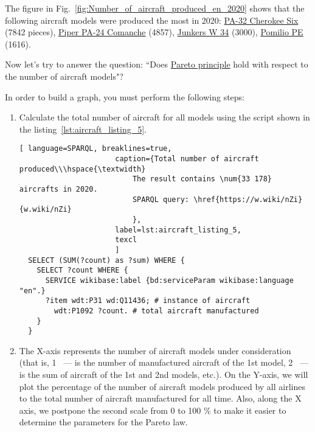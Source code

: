 The figure in Fig.~\ref{fig:Number_of_aircraft_produced_en_2020} shows that the following aircraft models were produced the most in 
2020: \href{https://www.wikidata.org/wiki/Q2096452}{PA-32 Cherokee Six} (\num{7842} pieces), \href{https://www.wikidata.org/wiki/Q1860367}{Piper PA-24 Comanche} 
(\num{4857}), \href{https://www.wikidata.org/wiki/Q694521}{Junkers W 34} (\num{3000}), \href{https://www.wikidata.org/wiki/Q941011}{Pomilio PE} 
(\num{1616}).

\begin{figure*}[h]

    \setlength{\fboxsep}{0pt}%
    \setlength{\fboxrule}{1pt}%

	\caption{Number of aircraft produced by model, 2020.}%
    \label{fig:Number_of_aircraft_produced_en_2020}%
\end{figure*}

Now let's try to answer the question: ``Does \href{https://en.wikipedia.org/wiki/Pareto_principle}{Pareto principle} hold with respect to the 
number of aircraft models"?

In order to build a graph, you must perform the following steps:

\begin{enumerate} 
  \item Calculate the total number of aircraft for all models using the script shown in the listing~\ref{lst:aircraft_listing_5}.

  \begin{lstlisting}[ language=SPARQL, breaklines=true,  
                      caption={Total number of aircraft produced\\\hspace{\textwidth}
                          The result contains \num{33 178} aircrafts in 2020.
                          SPARQL query: \href{https://w.wiki/nZi}{w.wiki/nZi}
                          },
                      label=lst:aircraft_listing_5,
                      texcl 
                      ]
  SELECT (SUM(?count) as ?sum) WHERE {
    SELECT ?count WHERE {
      SERVICE wikibase:label {bd:serviceParam wikibase:language "en".}
      ?item wdt:P31 wd:Q11436; # instance of aircraft
        wdt:P1092 ?count. # total aircraft manufactured
    }
  }
  \end{lstlisting}

  \item The X-axis represents the number of aircraft models under consideration (that is, 1 ~--- is the number of manufactured aircraft of the 1st 
  model, 2 ~--- is the sum of aircraft of the 1st and 2nd models, etc.). On the Y-axis, we will plot the percentage of the number of aircraft models 
  produced by all airlines to the total number of aircraft manufactured for all time. Also, along the X axis, we postpone the second scale from 
  0 to 100 \% to make it easier to determine the parameters for the Pareto law.
\end{enumerate}

